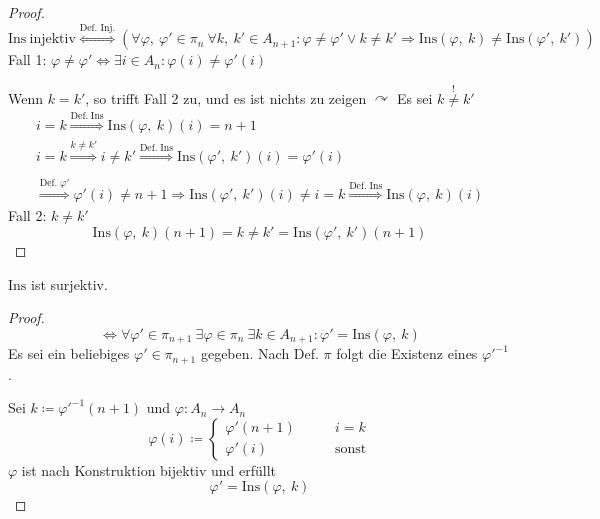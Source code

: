 \documentclass[a4paper, 12pt]{scrartcl}
\newcommand{\defimpl}[1]{\stackrel{\text{Def.}\;#1}{\Longrightarrow}}
\newcommand{\txtImpl}[1]{\stackrel{\text{#1}}{\Longleftrightarrow}}
\begin{document}
\begin{proof}
\[ \mathrm{Ins}\ \text{injektiv} \txtImpl{Def. Inj.} \left( \forall\varphi,\ \varphi' \in \pi_n\ \forall k,\ k' \in A_{n+1} : \varphi \neq \varphi' \vee k \neq k' \Rightarrow \mathrm{Ins}(\varphi,\ k) \neq \mathrm{Ins}(\varphi',\ k') \right) \]
Fall 1: $\varphi \neq \varphi' \Leftrightarrow \exists i \in A_n : \varphi(i) \neq \varphi'(i)$

Wenn $k = k'$, so trifft Fall 2 zu, und es ist nichts zu zeigen $
\curvearrowright$ Es sei $k \stackrel{!}{\neq} k'$
\begin{gather*}
	i = k \defimpl{\mathrm{Ins}} \mathrm{Ins}(\varphi,\ k)(i) = n+1 \\
	i = k \stackrel{k \neq k'}{\Longrightarrow} i \neq k' \defimpl{\mathrm{Ins}} \mathrm{Ins}(\varphi',\ k')(i) = \varphi'(i)\\\\
	\defimpl{\varphi'} \varphi'(i) \neq n+1 \Rightarrow \mathrm{Ins}(\varphi',\ k')(i) \neq 
	i = k \defimpl{\mathrm{Ins}} \mathrm{Ins}(\varphi,\ k)(i)
\end{gather*}
Fall 2: $k \neq k'$
\[  \mathrm{Ins}(\varphi,\ k)(n+1) = k \neq k' = \mathrm{Ins}(\varphi',\ k')(n+1) \]
\end{proof}
\newpage
\begin{lemma}\label{lemma2}
$\mathrm{Ins}$ ist surjektiv.
\end{lemma}
\begin{proof}
\[ \Leftrightarrow \forall \varphi' \in \pi_{n+1}\ \exists \varphi \in \pi_n\ \exists k \in A_{n+1} : \varphi' = \mathrm{Ins}(\varphi,\ k)\]
Es sei ein beliebiges $\varphi' \in \pi_{n+1}$ gegeben. Nach Def. $\pi$ folgt die Existenz eines $\varphi'^{-1}$.

Sei $k \coloneqq \varphi'^{-1}(n+1)$ und $\varphi: A_n \rightarrow A_n$
\[ \varphi(i) \coloneqq \begin{cases}
	\varphi'(n+1) &\qquad i = k \\
	\varphi'(i) &\qquad \text{sonst}
\end{cases} \]
$\varphi$ ist nach Konstruktion bijektiv und erfüllt
\[ \varphi' = \mathrm{Ins}(\varphi,\ k) \]
\end{proof}
\end{document}
